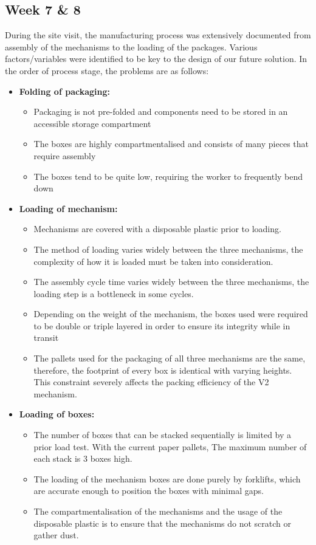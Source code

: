 \documentclass[a4paper, fleqn]{article}
\begin{document}
\subsection{Week 7 \& 8}
During the site visit, the manufacturing process was extensively documented from assembly of the mechanisms to the loading of the packages. Various factors/variables were identified to be key to the design of our future solution. In the order of process stage, the problems are as follows:\begin{itemize}
\item \textbf{Folding of packaging:}\begin{itemize}
\item Packaging is not pre-folded and components need to be stored in an accessible storage compartment
\item The boxes are highly compartmentalised and consists of many pieces that require assembly 
\item The boxes tend to be quite low, requiring the worker to frequently bend down
\end{itemize}
\item \textbf{Loading of mechanism:}\begin{itemize}
\item Mechanisms are covered with a disposable plastic prior to loading.
\item The method of loading varies widely between the three mechanisms, the complexity of how it is loaded must be taken into consideration.
\item The assembly cycle time varies widely between the three mechanisms, the loading step is a bottleneck in some cycles.
\item Depending on the weight of the mechanism, the boxes used were required to be double or triple layered in order to ensure its integrity while in transit
\item The pallets used for the packaging of all three mechanisms are the same, therefore, the footprint of every box is identical with varying heights. This constraint severely affects the packing efficiency of the V2 mechanism.
\end{itemize}
\item \textbf{Loading of boxes:}\begin{itemize}
\item The number of boxes that can be stacked sequentially is limited by a prior load test. With the current paper pallets, The maximum number of each stack is 3 boxes high.
\item The loading of the mechanism boxes are done purely by forklifts, which are accurate enough to position the boxes with minimal gaps.
\item The compartmentalisation of the mechanisms and the usage of the disposable plastic is to ensure that the mechanisms do not scratch or gather dust.
\end{itemize}
\end{itemize}
\pagebreak
\end{document}
